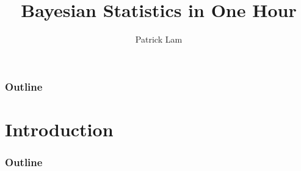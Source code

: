 \documentclass[handout]{beamer}
\author{Patrick Lam}
\title{Bayesian Statistics in One Hour}
\date{}
\begin{document}
\newcommand{\red}{\textcolor{red}}
\newcommand{\blue}{\textcolor{blue}}
\newcommand{\purple}{\textcolor{purple}}
\newcommand{\brown}{\textcolor{brown}}
\newcommand{\cyan}{\textcolor{cyan}}

\frame{\titlepage}

\begin{frame}
\frametitle{Outline}
\tableofcontents
\end{frame}

\section{Introduction}

\begin{frame}
\frametitle{Outline}
\tableofcontents[currentsection]
\end{frame}
\end{document}
